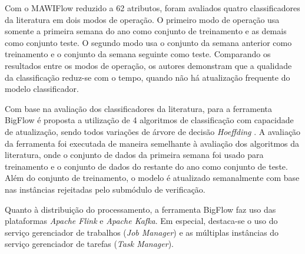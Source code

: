 
Com o \dataset MAWIFlow reduzido a 62 atributos, foram avaliados quatro
classificadores da literatura em dois modos de operação.
O primeiro modo de operação usa somente a primeira semana do ano como conjunto
de treinamento e as demais como conjunto teste.
O segundo modo usa o conjunto da semana anterior como treinamento e o
conjunto da semana seguinte como teste.
Comparando os resultados entre os modos de operação, os autores demonstram que a qualidade da
classificação reduz-se com o tempo, quando não há atualização frequente do modelo
classificador.

Com base na avaliação dos classificadores da literatura, para a ferramenta
BigFlow é proposta a utilização de 4 algoritmos de classificação com capacidade
de atualização, sendo todos variações de árvore de decisão
\emph{Hoeffding} \cite{Viegas2019,Domingos2000}.
A avaliação da ferramenta foi executada de maneira semelhante à avaliação
dos algoritmos da literatura, onde o conjunto de dados da primeira semana foi
usado para treinamento e o conjunto de dados do restante do ano como conjunto
de teste.
Além do conjunto de treinamento, o modelo é atualizado semanalmente com base nas
instâncias rejeitadas pelo submódulo de verificação.


\newcommand{\kafka}{\emph{Apache Kafka}\xspace}
\newcommand{\flink}{\emph{Apache Flink}\xspace}

Quanto à distribuição do processamento,
a ferramenta BigFlow faz uso das plataformas \flink e \kafka.
Em especial, destaca-se o uso do serviço gerenciador de trabalhos (\emph{Job
Manager}) e as múltiplas instâncias do serviço gerenciador de tarefas
(\emph{Task Manager}).


